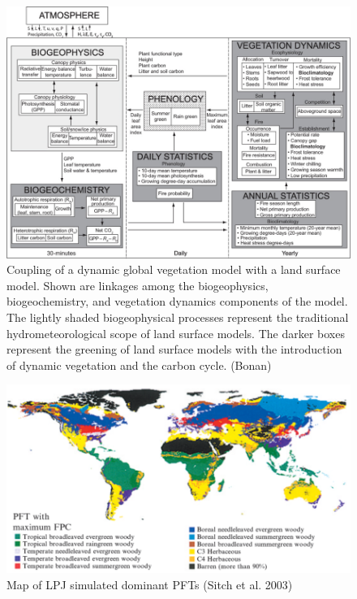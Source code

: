 \documentclass[12pt,oneside]{book}
\begin{document}
\begin{figure}

{\centering \includegraphics[width=0.8\linewidth]{figures/chap6/f64_LPJ_fllowchart} 

}

\caption{Coupling of a dynamic global vegetation model with a land surface model. Shown are linkages among the biogeophysics, biogeochemistry, and vegetation dynamics components of the model. The lightly shaded biogeophysical processes represent the traditional hydrometeorological scope of land surface models. The darker boxes represent the greening of land surface models with the introduction of dynamic vegetation and the carbon cycle. (Bonan)}\label{fig:f64}
\end{figure}

\begin{figure}

{\centering \includegraphics[width=0.8\linewidth]{figures/chap6/f65_LPJ_PFTmap} 

}

\caption{Map of LPJ simulated dominant PFTs (Sitch et al. 2003)}\label{fig:f65}
\end{figure}
\end{document}
